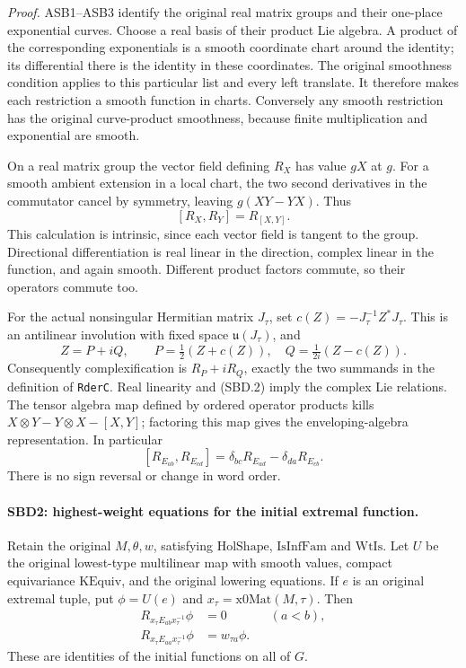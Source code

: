 \emph{Proof.}
ASB1--ASB3 identify the original real matrix groups and their
one-place exponential curves.  Choose a real basis of their product
Lie algebra.  A product of the corresponding exponentials is a
smooth coordinate chart around the identity; its differential there
is the identity in these coordinates.  The original smoothness
condition applies to this particular list and every left translate.
It therefore makes each restriction a smooth function in charts.
Conversely any smooth restriction has the original curve-product
smoothness, because finite multiplication and exponential are smooth.

On a real matrix group the vector field defining \(R_X\) has value
\(gX\) at \(g\).  For a smooth ambient extension in a local chart,
the two second derivatives in the commutator cancel by symmetry,
leaving \(g(XY-YX)\).  Thus
\[
 [R_X,R_Y]=R_{[X,Y]}.
 \tag{SBD.2}
\]
This calculation is intrinsic, since each vector field is tangent
to the group.  Directional differentiation is real linear in the
direction, complex linear in the function, and again smooth.
Different product factors commute, so their operators commute too.

For the actual nonsingular Hermitian matrix \(J_\tau\), set
\(c(Z)=-J_\tau^{-1}Z^*J_\tau\).  This is an antilinear involution
with fixed space \(\mathfrak u(J_\tau)\), and
\[
 Z=P+iQ,\qquad P=\tfrac12(Z+c(Z)),\quad
 Q=\tfrac1{2i}(Z-c(Z)).
 \tag{SBD.3}
\]
Consequently complexification is \(R_P+iR_Q\), exactly the two
summands in the definition of \texttt{Rder\allowbreak C}.  Real linearity and
(SBD.2) imply the complex Lie relations.  The tensor algebra map
defined by ordered operator products kills
\(X\otimes Y-Y\otimes X-[X,Y]\); factoring this map gives the
enveloping-algebra representation.  In particular
\[
 [R_{E_{ab}},R_{E_{cd}}]
   =\delta_{bc}R_{E_{ad}}-\delta_{da}R_{E_{cb}}.
 \tag{SBD.4}
\]
There is no sign reversal or change in word order.

\paragraph{SBD2: highest-weight equations for the initial extremal function.}
\label{claim:SBD2}
Retain the original \(M,\theta,w\), satisfying
\(\mathrm{HolShape}\), \(\mathrm{IsInfFam}\) and \(\mathrm{WtIs}\).
Let \(U\) be the original lowest-type multilinear map with smooth
values, compact equivariance \(\mathrm{KEquiv}\), and the original
lowering equations.  If \(e\) is an original extremal tuple, put
\(\phi=U(e)\) and \(x_\tau=\mathrm{x0Mat}(M,\tau)\).  Then
\[
 \begin{aligned}
 R_{x_\tau E_{ab}x_\tau^{-1}}\phi&=0 &&(a<b),\\
 R_{x_\tau E_{aa}x_\tau^{-1}}\phi&=w_{\tau a}\phi.
 \end{aligned}
 \tag{SBD.5}
\]
These are identities of the initial functions on all of \(G\).

